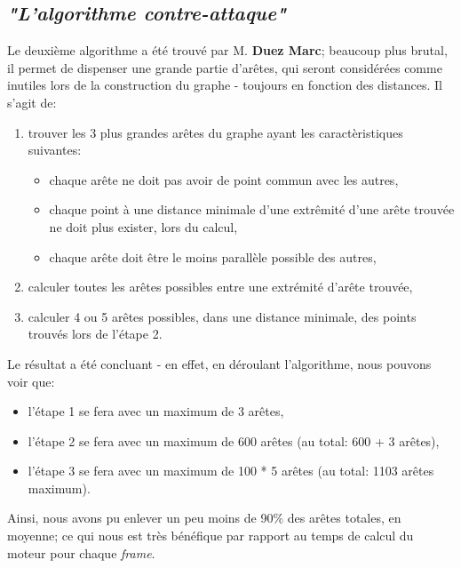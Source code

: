 \documentclass[pdftex,12pt,a4paper]{report}
\begin{document}
\begin{spacing}{1.2}
\subsection{\textit{"L'algorithme contre-attaque"}}
Le deuxième algorithme a été trouvé par M. \textbf{Duez Marc}; beaucoup plus brutal, il permet de dispenser une grande partie d'arêtes, qui seront considérées comme inutiles lors de la construction du graphe - toujours en fonction des distances.
\newline
Il s'agit de:
\begin{enumerate}
\item trouver les 3 plus grandes arêtes du graphe ayant les caractèristiques suivantes:
	\begin{itemize}
	\item chaque arête ne doit pas avoir de point commun avec les autres,
	\item chaque point à une distance minimale d'une extrêmité d'une arête trouvée ne doit plus exister, lors du calcul,
	\item chaque arête doit être le moins parallèle possible des autres,
	\end{itemize}
\item calculer toutes les arêtes possibles entre une extrémité d'arête trouvée,
\item calculer 4 ou 5 arêtes possibles, dans une distance minimale, des points trouvés lors de l'étape 2.
\end{enumerate}
Le résultat a été concluant - en effet, en déroulant l'algorithme, nous pouvons voir que:
\begin{itemize}
\item l'étape 1 se fera avec un maximum de 3 arêtes,
\item l'étape 2 se fera avec un maximum de 600 arêtes (au total: 600 + 3 arêtes),
\item l'étape 3 se fera avec un maximum de 100 * 5 arêtes (au total: 1103 arêtes maximum).
\end{itemize}
Ainsi, nous avons pu enlever un peu moins de 90\% des arêtes totales, en moyenne; ce qui nous est très bénéfique par rapport au temps de calcul du moteur pour chaque \textit{frame}.


\end{spacing}
\end{document}
